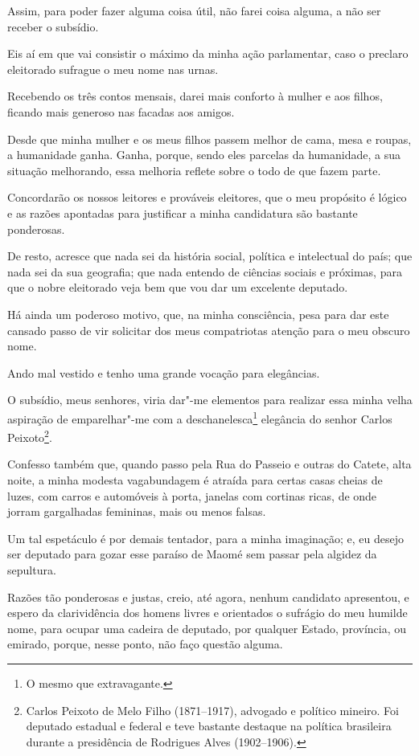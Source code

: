 Assim, para poder fazer alguma coisa útil, não farei coi­sa alguma, a
não ser receber o subsídio.

Eis aí em que vai consistir o máximo da minha ação parlamentar, caso o
preclaro eleitorado sufrague o meu nome nas urnas.

Recebendo os três contos mensais, darei mais conforto à mu­lher e aos
filhos, ficando mais generoso nas facadas aos amigos.

Desde que minha mulher e os meus filhos passem melhor de cama, mesa e
roupas, a humanidade ganha. Ganha, porque, sendo eles parcelas da
humanidade, a sua situação melhorando, essa melhoria reflete sobre o
todo de que fazem parte.

Concordarão os nossos leitores e prováveis eleitores, que o meu
propósito é lógico e as razões apontadas para justificar a minha
candidatura são bastante ponderosas.

De resto, acresce que nada sei da história social, política e
intelectual do país; que nada sei da sua geografia; que nada entendo de
ciências sociais e próximas, para que o no­bre eleitorado veja bem que
vou dar um excelente deputado.

Há ainda um poderoso motivo, que, na minha consciência, pesa para dar
este cansado passo de vir solicitar dos meus compatriotas atenção para o
meu obscuro nome.

Ando mal vestido e tenho uma grande vocação para elegâncias.

O subsídio, meus senhores, viria dar"-me elementos para realizar essa
minha velha aspiração de emparelhar"-me com a deschanelesca\footnote{O
  mesmo que extravagante.} elegância do senhor Carlos Peixoto\footnote{Carlos
  Peixoto de Melo Filho (1871--1917), advogado e político mineiro. Foi
  deputado estadual e federal e teve bastante destaque na política
  brasileira durante a presidência de Rodrigues Alves (1902--1906).}.

Confesso também que, quando passo pela Rua do Passeio e outras do
Catete, alta noite, a minha modesta vagabundagem é atraída para certas
casas cheias de luzes, com carros e automóveis à porta, janelas com
cortinas ricas, de onde jorram gargalhadas femininas, mais ou menos
falsas.

Um tal espetáculo é por demais tentador, para a minha imaginação; e, eu
desejo ser deputado para gozar esse paraíso de Maomé sem passar pela
algidez da sepultura.

Razões tão ponderosas e justas, creio, até agora, nenhum candidato
apresentou, e espero da clarividência dos homens livres e orientados o
sufrágio do meu humilde nome, para ocupar uma cadeira de deputado, por
qualquer Estado, província, ou emirado, porque, nesse ponto, não faço
questão alguma.

